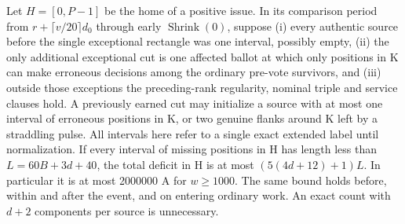 \begin{lemma}\label{lem:components}
Let \(H=[0,P-1]\) be the home of a positive issue. In its comparison period from \(r+\lceil v/20 \rceil d_0\) through early \(\operatorname{Shrink}(0)\), suppose (i) every authentic source before the single exceptional rectangle was one interval, possibly empty, (ii) the only additional exceptional cut is one affected ballot at which only positions in K can make erroneous decisions among the ordinary pre-vote survivors, and (iii) outside those exceptions the preceding-rank regularity, nominal triple and service clauses hold. A previously earned cut may initialize a source with at most one interval of erroneous positions in K, or two genuine flanks around K left by a straddling pulse. All intervals here refer to a single exact extended label until normalization. If every interval of missing positions in H has length less than \(L=60B+3d+40\), the total deficit in H is at most \((5(4d+12)+1)L\). In particular it is at most 2000000 A for \(w\ge 1000\). The same bound holds before, within and after the event, and on entering ordinary work. An exact count with \(d+2\) components per source is unnecessary.
\end{lemma}
